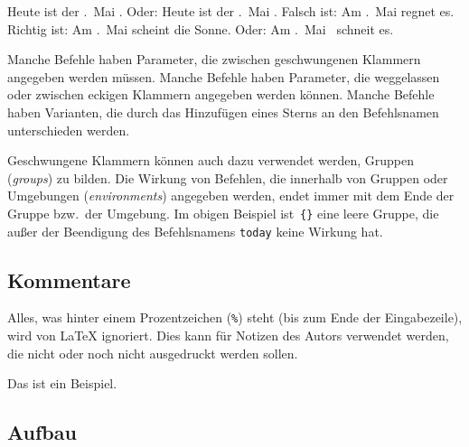 \begin{LTXexample}[firstline=4]
\renewcommand*\today{%
  \the\numexpr{}\relax.~Mai \the\year}
\obeylines
Heute ist der \today.
Oder: Heute ist der \today .
Falsch ist:
 Am \today regnet es.
Richtig ist:
 Am \today{} scheint die Sonne.
 Oder: Am \today\ schneit es.
\end{LTXexample}



Manche Befehle haben Parameter, die zwischen geschwungenen Klammern angegeben
werden müssen. Manche Befehle haben Parameter, die weggelassen oder zwischen
eckigen Klammern angegeben werden können. Manche Befehle haben Varianten, die
durch das Hinzufügen eines Sterns an den Befehlsnamen unterschieden werden.

Geschwungene Klammern können auch dazu verwendet werden, Gruppen (\emph{groups})
zu bilden. Die Wirkung von Befehlen, die innerhalb von Gruppen oder Umgebungen
(\emph{environments}) angegeben werden, endet immer mit dem Ende der Gruppe
bzw.\ der Umgebung.  Im obigen Beispiel ist~\lstinline|{}| eine leere Gruppe, die
außer der Beendigung des Befehlsnamens \texttt{today} keine Wirkung hat.

\subsection{Kommentare}

Alles, was hinter einem Prozentzeichen (\lstinline|%|) steht (bis zum Ende der
Eingabezeile), wird von \LaTeX{} ignoriert. Dies kann für Notizen des Autors
verwendet werden, die nicht oder noch nicht ausgedruckt werden sollen.
\begin{LTXexample}
Das ist ein %
Beispiel.
\end{LTXexample}

\subsection{Aufbau}

